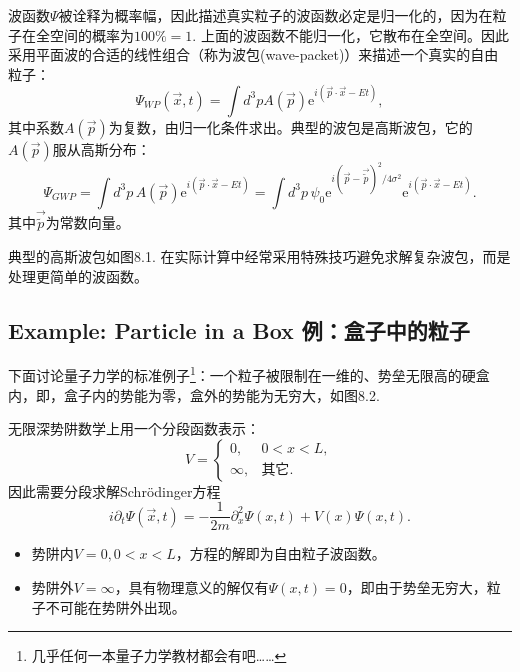 
波函数$\Psi$被诠释为概率幅，因此描述真实粒子的波函数必定是归一化的，因为在粒子在全空间的概率为$100\% = 1$. 上面的波函数不能归一化，它散布在全空间。因此采用平面波的合适的线性组合（称为波包(wave-packet)）来描述一个真实的自由粒子：
\begin{equation}
\label{equ8.26}
	\Psi_{WP} (\vec{x}, t) = \int d^3 p A(\vec{p}) \mathrm{e}^{i (\vec{p} \cdot \vec{x} - Et)},
\end{equation}
其中系数$A(\vec{p})$为复数，由归一化条件求出。典型的波包是高斯波包，它的$A(\vec{p})$服从高斯分布：
\[
	\Psi_{GWP} = \int d^3 p\, A(\vec{p}) \mathrm{e}^{i (\vec{p} \cdot \vec{x} - Et)} = \int d^3 p\, \psi_0 \mathrm{e}^{i (\vec{p} - \vec{\tilde{p}})^2 / 4\sigma^2} \mathrm{e}^{i (\vec{p} \cdot \vec{x} - Et)}.
\]
其中$\vec{\tilde{p}}$为常数向量。

典型的高斯波包如图8.1. 在实际计算中经常采用特殊技巧避免求解复杂波包，而是处理更简单的波函数。

\subsection[例：盒子中的粒子]{Example: Particle in a Box \quad 例：盒子中的粒子}\label{sec8.5.2}

下面讨论量子力学的标准例子\footnote{几乎任何一本量子力学教材都会有吧……}：一个粒子被限制在一维的、势垒无限高的硬盒内，即，盒子内的势能为零，盒外的势能为无穷大，如图8.2.

无限深势阱数学上用一个分段函数表示：
\begin{equation}
\label{equ8.27}
	V = 
		\begin{cases}
			0, & 0 < x < L, \\
			\infty, & \text{其它}.
		\end{cases}
\end{equation}
因此需要分段求解Schrödinger方程
\[
	i \partial_t \Psi(\vec{x}, t) = -\frac{1}{2m} \partial_x^2 \Psi(x, t) + V(x) \Psi(x, t).
\]
\begin{itemize}
	\item 势阱内$V = 0, 0 < x < L$，方程的解即为自由粒子波函数。
	\item 势阱外$V = \infty$，具有物理意义的解仅有$\Psi(x, t) = 0$，即由于势垒无穷大，粒子不可能在势阱外出现。
\end{itemize}

